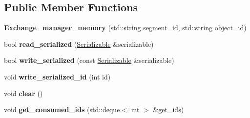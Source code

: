 \subsection*{Public Member Functions}
\begin{DoxyCompactItemize}
\item 
\mbox{\label{classshared__memory_1_1internal_1_1Exchange__manager__memory_a4bb976aa1b16314bf4181035bb746869}} 
{\bfseries Exchange\+\_\+manager\+\_\+memory} (std\+::string segment\+\_\+id, std\+::string object\+\_\+id)
\item 
\mbox{\label{classshared__memory_1_1internal_1_1Exchange__manager__memory_aa0efbb57f5fafc8faa52f112b4db705e}} 
bool {\bfseries read\+\_\+serialized} (\hyperlink{classSerializable}{Serializable} \&serializable)
\item 
\mbox{\label{classshared__memory_1_1internal_1_1Exchange__manager__memory_a4b5fddf9270c80e4fbcb041947b4142c}} 
bool {\bfseries write\+\_\+serialized} (const \hyperlink{classSerializable}{Serializable} \&serializable)
\item 
\mbox{\label{classshared__memory_1_1internal_1_1Exchange__manager__memory_a89d6cea01eca5ba87bff929e6bc7049f}} 
void {\bfseries write\+\_\+serialized\+\_\+id} (int id)
\item 
\mbox{\label{classshared__memory_1_1internal_1_1Exchange__manager__memory_ae9babbca9b477db799c6bbfe3aab425b}} 
void {\bfseries clear} ()
\item 
\mbox{\label{classshared__memory_1_1internal_1_1Exchange__manager__memory_a166fd53fb2da0da38801138ff1119e4c}} 
void {\bfseries get\+\_\+consumed\+\_\+ids} (std\+::deque$<$ int $>$ \&get\+\_\+ids)
\item 
\mbox{\label{classshared__memory_1_1internal_1_1Exchange__manager__memory_a9294652f5d187c25308fc185107405ce}} 

\end{DoxyCompactItemize}
